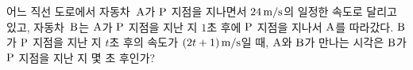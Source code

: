 어느 직선 도로에서 자동차~$\mathrm{A}$가 $\mathrm{P}$ 지점을 지나면서 $24\mkern3mu \mathrm{m/s}$의 일정한 속도로 달리고 있고, 자동차~$\mathrm{B}$는 $\mathrm{A}$가 $\mathrm{P}$ 지점을 지난 지 $1$초 후에 $\mathrm{P}$ 지점을 지나서 $\mathrm{A}$를 따라갔다. $\mathrm{B}$가 $\mathrm{P}$ 지점을 지난 지 $t$초 후의 속도가 $(2t+1)\mkern3mu \mathrm{m/s}$일 때, $\mathrm{A}$와 $\mathrm{B}$가 만나는 시각은 $\mathrm{B}$가 $\mathrm{P}$ 지점을 지난 지 몇 초 후인가?
